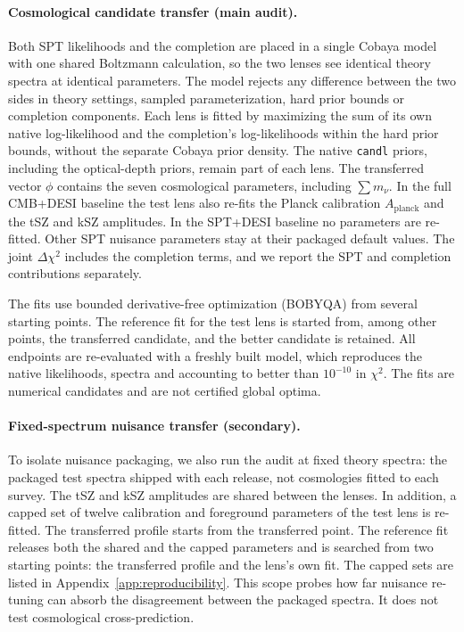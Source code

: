 \documentclass[11pt]{article}
\theoremstyle{remark}
\newcommand{\dchi}{\Delta \chi^2}
\newcommand{\mnu}{\sum m_\nu}
\numberwithin{equation}{section}
\begin{document}
\paragraph{Cosmological candidate transfer (main audit).}
Both SPT likelihoods and the completion are placed in a single Cobaya model with one shared Boltzmann calculation, so the two lenses see identical theory spectra at identical parameters. The model rejects any difference between the two sides in theory settings, sampled parameterization, hard prior bounds or completion components. Each lens is fitted by maximizing the sum of its own native log-likelihood and the completion's log-likelihoods within the hard prior bounds, without the separate Cobaya prior density. The native \texttt{candl} priors, including the optical-depth priors, remain part of each lens. The transferred vector $\phi$ contains the seven cosmological parameters, including $\mnu$. In the full CMB+DESI baseline the test lens also re-fits the Planck calibration $A_{\mathrm{planck}}$ and the tSZ and kSZ amplitudes. In the SPT+DESI baseline no parameters are re-fitted. Other SPT nuisance parameters stay at their packaged default values. The joint $\dchi$ includes the completion terms, and we report the SPT and completion contributions separately.

The fits use bounded derivative-free optimization (BOBYQA) from several starting points. The reference fit for the test lens is started from, among other points, the transferred candidate, and the better candidate is retained. All endpoints are re-evaluated with a freshly built model, which reproduces the native likelihoods, spectra and accounting to better than $10^{-10}$ in $\chi^2$. The fits are numerical candidates and are not certified global optima.

\paragraph{Fixed-spectrum nuisance transfer (secondary).}
To isolate nuisance packaging, we also run the audit at fixed theory spectra: the packaged test spectra shipped with each release, not cosmologies fitted to each survey. The tSZ and kSZ amplitudes are shared between the lenses. In addition, a capped set of twelve calibration and foreground parameters of the test lens is re-fitted. The transferred profile starts from the transferred point. The reference fit releases both the shared and the capped parameters and is searched from two starting points: the transferred profile and the lens's own fit. The capped sets are listed in Appendix~\ref{app:reproducibility}. This scope probes how far nuisance re-tuning can absorb the disagreement between the packaged spectra. It does not test cosmological cross-prediction.
\end{document}
